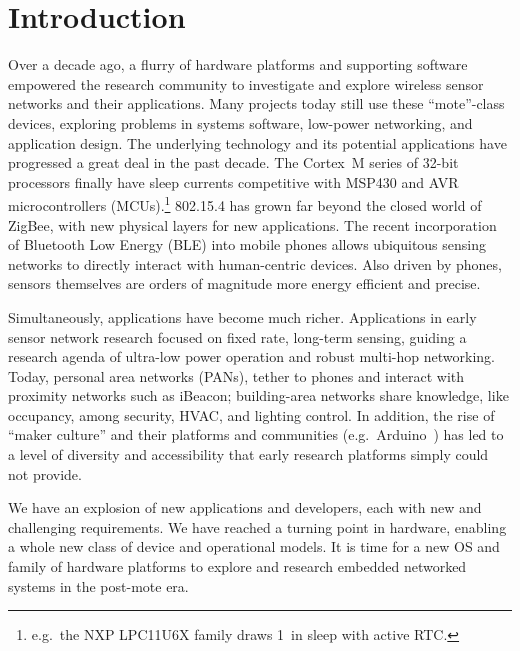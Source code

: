 \section{Introduction}
\label{sec:intro}

Over a decade ago, a flurry of hardware platforms and supporting software
empowered the research community to investigate and explore wireless sensor
networks and their applications. Many projects today still use these
``mote''-class devices, exploring problems in systems software, low-power
networking, and application design.
%
The underlying technology and its potential applications have progressed a
great deal in the past decade. The Cortex~M series of 32-bit processors
finally have sleep currents competitive with MSP430 and AVR microcontrollers
(MCUs).\footnote{
  e.g.\ the NXP LPC11U6X family draws 1~\uA in sleep with active RTC.
}
802.15.4 has grown far beyond the closed world of ZigBee, with
new physical layers for new applications. The recent incorporation of
Bluetooth Low Energy (BLE) into mobile phones allows ubiquitous sensing networks to
directly interact with human-centric devices. Also driven by phones, sensors
themselves are orders of magnitude more energy efficient and precise.

Simultaneously, applications have become much richer. Applications in early
sensor network research focused on fixed rate, long-term sensing, guiding a
research agenda of ultra-low power operation and robust multi-hop networking.
Today, personal area networks (PANs), tether to phones and interact with
proximity networks such as iBeacon; building-area networks share knowledge, like
occupancy, among security, HVAC, and lighting control.
In addition, the rise of ``maker culture'' and their platforms and communities
(e.g.\ Arduino~\cite{arduino}) has led to a level of diversity and
accessibility that early research platforms simply could not provide.

We have an explosion of new applications and developers, each with new and challenging
requirements. We have reached a turning point in hardware, enabling a whole
new class of device and operational models. It is time for a new OS and family
of hardware platforms to explore and research embedded networked systems in
the post-mote era.


